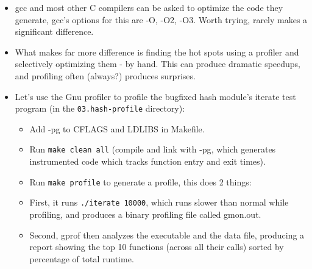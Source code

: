 \documentclass[handout]{beamer}
\newcommand{\pitem}{\pause \item}
\begin{document}
\begin{frame}[fragile]
    \begin{itemize}
    \item
      \alert{gcc} and most other C compilers can be asked to
      \alert{optimize the code they generate}, gcc's options for this
      are \alert{-O, -O2, -O3}.
      Worth trying, rarely makes a significant difference.
    \pause
    \item
      What makes far more difference is finding the \alert{hot spots}
      using a \alert{profiler} and selectively optimizing them - by hand.
      This can produce dramatic speedups, and profiling often (always?)
      produces surprises.
    \pause
    \item
      Let's use the \alert{Gnu profiler} to profile the bugfixed hash
      module's \alert{iterate} test program
      (in the \verb+03.hash-profile+ directory):
      \begin{itemize}
      \item
        Add -pg to CFLAGS and LDLIBS in Makefile.
      \item
	Run \verb+make clean all+
	(compile and link with \alert{-pg}, which generates instrumented
        code which tracks function entry and exit times).
      \item
	Run \verb+make profile+ to generate a profile, this does 2 things:
      \pitem
	First, it runs \verb+./iterate 10000+, which runs slower than normal
  	while profiling, and produces a binary profiling file
	called \alert{gmon.out}.
      \item
        Second, \alert{gprof} then analyzes the executable and the
        data file, producing a report showing the top 10 functions
        (across all their calls) sorted by percentage of total runtime.
      \end{itemize}
    \end{itemize}
\end{frame}
\end{document}
